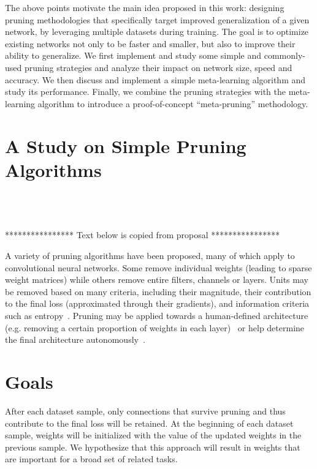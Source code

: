 \documentclass{article}
\begin{document}
The above points motivate the main idea proposed in this work: designing pruning methodologies that specifically target improved generalization of a given network, by leveraging multiple datasets during training. The goal is to optimize existing networks not only to be faster and smaller, but also to improve their ability to generalize. We first implement and study some simple and commonly-used pruning strategies and analyze their impact on network size, speed and accuracy. We then discuss and implement a simple meta-learning algorithm and study its performance. Finally, we combine the pruning strategies with the meta-learning algorithm to introduce a proof-of-concept ``meta-pruning'' methodology.


\section{A Study on Simple Pruning Algorithms}




\ \\ 
\ \\
\ \\
**************** Text below is copied from proposal ****************

A variety of pruning algorithms have been proposed, many of which apply to convolutional neural networks. Some remove individual weights (leading to sparse weight matrices) while others remove entire filters, channels or layers. Units may be removed based on many criteria, including their magnitude, their contribution to the final loss (approximated through their gradients), and information criteria such as entropy~\citet{NIPS_learning_weights_pruning, prune_transfer_learning, prune_entropy, prune_slimming}.  Pruning may be applied towards a human-defined architecture (e.g. removing a certain proportion of weights in each layer)~\citet{prune_nisp} or help determine the final architecture autonomously~\citet{prune_thinet}. 

\section{Goals}





After each dataset sample, only connections that survive pruning and thus contribute to the final loss will be retained.  At the beginning of each dataset sample, weights will be initialized with the value of the updated weights in the previous sample. We hypothesize that this approach will result in weights that are important for a broad set of related tasks. 
\end{document}
